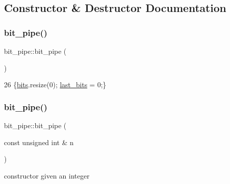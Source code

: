 \subsection{Constructor \& Destructor Documentation}
\mbox{\label{classbit__pipe_a6dab67e6a47c1d1f020fe769df27cef1}} 
\subsubsection{\texorpdfstring{bit\+\_\+pipe()}{bit\_pipe()}\hspace{0.1cm}{\footnotesize\ttfamily [1/3]}}
{\footnotesize\ttfamily bit\+\_\+pipe\+::bit\+\_\+pipe (\begin{DoxyParamCaption}{ }\end{DoxyParamCaption})\hspace{0.3cm}{\ttfamily [inline]}}


\begin{DoxyCode}
26 \{\hyperlink{classbit__pipe_a86f38af1e9736b053728033490476b50}{bits}.resize(0); \hyperlink{classbit__pipe_a0f3e84b02751803adaab499b5dad86fe}{last\_bits} = 0;\}
\end{DoxyCode}
\mbox{\label{classbit__pipe_a381c4371859988c65802767d31fc7458}} 
\subsubsection{\texorpdfstring{bit\+\_\+pipe()}{bit\_pipe()}\hspace{0.1cm}{\footnotesize\ttfamily [2/3]}}
{\footnotesize\ttfamily bit\+\_\+pipe\+::bit\+\_\+pipe (\begin{DoxyParamCaption}\item[{const unsigned int \&}]{n }\end{DoxyParamCaption})}



constructor given an integer 

